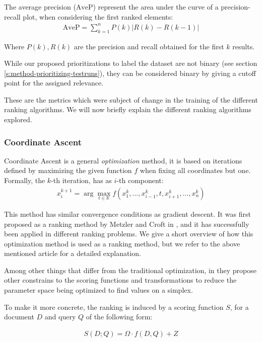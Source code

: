 The average precision ($\text{AveP}$) represent the area under the curve of a precision-recall
plot, when considering the first ranked elements:
\begin{align*}
\text{AveP} = \sum_{k=1}^{n} P(k)|R(k)-R(k-1)|
\end{align*}

Where $P(k), R(k)$ are the precision and recall obtained for the first $k$ results.

While our proposed prioritizations to label the dataset are not binary (see section \ref{s:method-prioritizing-testruns}),
they can be considered binary by giving a cutoff point for the assigned relevance.

These are the metrics which were subject of change in the training of the
different ranking algorithms. We will now briefly explain the different ranking algorithms
explored.

\subsubsection{Coordinate Ascent}
Coordinate Ascent is a general \textit{optimization} method, it is based on iterations defined
by maximizing the given function $f$ when fixing all coordinates but one. Formally, the $k$-th iteration,
has as $i$-th component:
\begin{align*}
x^{k+1}_i = \arg \max_{t\in\mathbb{R}} f(x^{k}_1, ..., x^{k}_{i-1}, t, x^{k}_{i+1}, ..., x^k_n)
\end{align*}

This method has similar convergence conditions as gradient descent. It was first proposed as a
ranking method by Metzler and Croft in \cite{Metzler2006LinearFM}, and it has successfully been applied
in different ranking problems. We give a short overview of how this optimization method is used as
a ranking method, but we refer to the above mentioned article for a detailed explanation.

Among other things that differ from the traditional optimization, in \cite{Metzler2006LinearFM} they propose 
other constrains to the scoring functions and transformations to reduce the parameter space 
being optimized to find values on a simplex.

To make it more concrete, the ranking is induced by a scoring function $S$, for a document $D$ and query $Q$
 of the following form:

\begin{align*}
S(D; Q) = \Omega \cdot f(D, Q) + Z
\end{align*}

